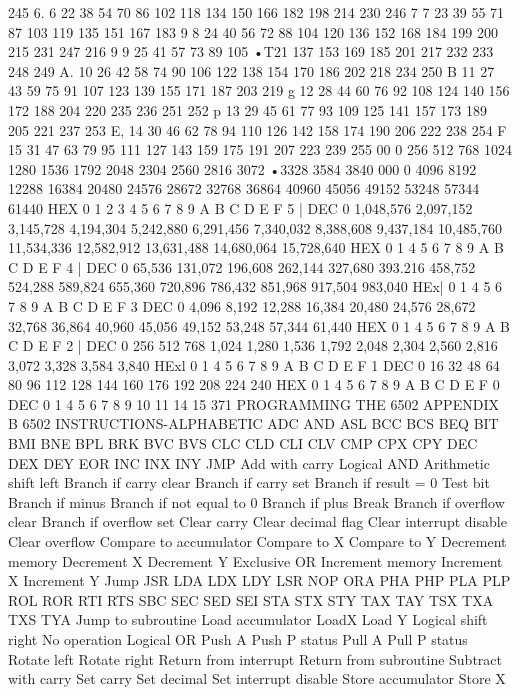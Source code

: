 \documentclass{book}
\begin{document}
{{{{{{{{{{{{{{{{{{{{{{{{{{{{{{{{{{{{{{{{{{{{{{{{{{{{{{{{{{{{{{{{{{{{{{{{{{{{{{{{{{{{{{{{{{{{{{{{{{{{{{{{{{{{{{{{{{{{{{{{{{{{{{{{{{{{{{{{{{{{245
6.
6
22
38
54
70
86
102
118
134
150
166
182
198
214
230
246
7
7
23
39
55
71
87
103
119
135
151
167
183
9
8
24
40
56
72
88
104
120
136
152
168
184
199 200
215
231
247
216
9
9
25
41
57
73
89
105
•T21
137
153
169
185
201
217
232 233
248 249
A.
10
26
42
58
74
90
106
122
138
154
170
186
202
218
234
250
B
11
27
43
59
75
91
107
123
139
155
171
187
203
219
g
12
28
44
60
76
92
108
124
140
156
172
188
204
220
235 236
251 252
p
13
29
45
61
77
93
109
125
141
157
173
189
205
221
237
253
E,
14
30
46
62
78
94
110
126
142
158
174
190
206
222
238
254
F
15
31
47
63
79
95
111
127
143
159
175
191
207
223
239
255
00
0
256
512
768
1024
1280
1536
1792
2048
2304
2560
2816
3072
•3328
3584
3840
000
0
4096
8192
12288
16384
20480
24576
28672
32768
36864
40960
45056
49152
53248
57344
61440
HEX
0
1
2
3
4
5
6
7
8
9
A
B
C
D
E
F
5
| DEC
0
1,048,576
2,097,152
3,145,728
4,194,304
5,242,880
6,291,456
7,340,032
8,388,608
9,437,184
10,485,760
11,534,336
12,582,912
13,631,488
14,680,064
15,728,640
HEX
0
1
4
5
6
7
8
9
A
B
C
D
E
F
4
| DEC
0
65,536
131,072
196,608
262,144
327,680
393.216
458,752
524,288
589,824
655,360
720,896
786,432
851,968
917,504
983,040
HEx|
0
1
4
5
6
7
8
9
A
B
C
D
E
F
3
DEC
0
4,096
8,192
12,288
16,384
20,480
24,576
28,672
32,768
36,864
40,960
45,056
49,152
53,248
57,344
61,440
HEX
0
1
4
5
6
7
8
9
A
B
C
D
E
F
2
| DEC
0
256
512
768
1,024
1,280
1,536
1,792
2,048
2,304
2,560
2,816
3,072
3,328
3,584
3,840
HExl
0
1
4
5
6
7
8
9
A
B
C
D
E
F
1
DEC
0
16
32
48
64
80
96
112
128
144
160
176
192
208
224
240
HEX
0
1
4
5
6
7
8
9
A
B
C
D
E
F
0
DEC
0
1
4
5
6
7
8
9
10
11
14
15
371
PROGRAMMING THE 6502
APPENDIX B
6502 INSTRUCTIONS-ALPHABETIC
ADC
AND
ASL
BCC
BCS
BEQ
BIT
BMI
BNE
BPL
BRK
BVC
BVS
CLC
CLD
CLI
CLV
CMP
CPX
CPY
DEC
DEX
DEY
EOR
INC
INX
INY
JMP
Add with carry
Logical AND
Arithmetic shift left
Branch if carry clear
Branch if carry set
Branch if result = 0
Test bit
Branch if minus
Branch if not equal to 0
Branch if plus
Break
Branch if overflow clear
Branch if overflow set
Clear carry
Clear decimal flag
Clear interrupt disable
Clear overflow
Compare to accumulator
Compare to X
Compare to Y
Decrement memory
Decrement X
Decrement Y
Exclusive OR
Increment memory
Increment X
Increment Y
Jump
JSR
LDA
LDX
LDY
LSR
NOP
ORA
PHA
PHP
PLA
PLP
ROL
ROR
RTI
RTS
SBC
SEC
SED
SEI
STA
STX
STY
TAX
TAY
TSX
TXA
TXS
TYA
Jump to subroutine
Load accumulator
LoadX
Load Y
Logical shift right
No operation
Logical OR
Push A
Push P status
Pull A
Pull P status
Rotate left
Rotate right
Return from interrupt
Return from subroutine
Subtract with carry
Set carry
Set decimal
Set interrupt disable
Store accumulator
Store X
}}}}}}}}}}}}}}}}}}}}}}}}}}}}}}}}}}}}}}}}}}}}}}}}}}}}}}}}}}}}}}}}}}}}}}}}}}}}}}}}}}}}}}}}}}}}}}}}}}}}}}}}}}}}}}}}}}}}}}}}}}}}}}}}}}}}}}}}}}}}
\end{document}
